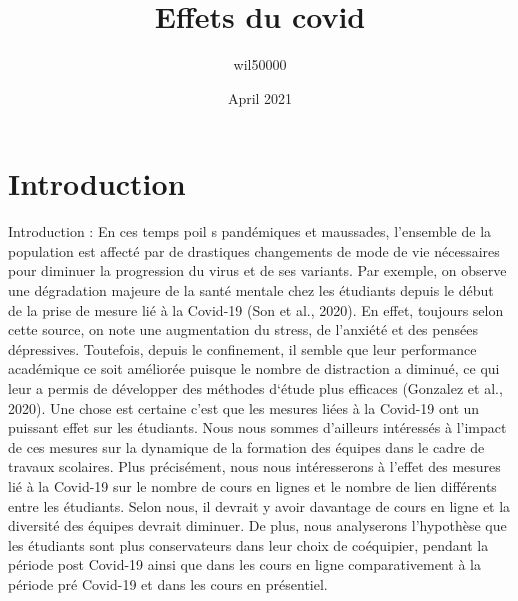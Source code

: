 \documentclass{article}
\title{Effets du covid}
\author{wil50000 }
\date{April 2021}
\begin{document}
\maketitle

\section{Introduction}
Introduction :  
En ces temps poil s pandémiques et maussades, l’ensemble de la population est affecté par de drastiques changements de mode de vie nécessaires pour diminuer la progression du virus et de ses variants. Par exemple, on observe une dégradation majeure de la santé mentale chez les étudiants depuis le début de la prise de mesure lié à la Covid-19 (Son et al., 2020). En effet, toujours selon cette source, on note une augmentation du stress, de l’anxiété et des pensées dépressives. Toutefois, depuis le confinement, il semble que leur performance académique ce soit améliorée puisque le nombre de distraction a diminué, ce qui leur a permis de développer des méthodes d‘étude plus efficaces (Gonzalez et al., 2020). Une chose est certaine c’est que les mesures liées à la Covid-19 ont un puissant effet sur les étudiants. Nous nous sommes d’ailleurs intéressés à l’impact de ces mesures sur la dynamique de la formation des équipes dans le cadre de travaux scolaires. Plus précisément, nous nous intéresserons à l’effet des mesures lié à la Covid-19 sur le nombre de cours en lignes et le nombre de lien différents entre les étudiants. Selon nous, il devrait y avoir davantage de cours en ligne et la diversité des équipes devrait diminuer. De plus, nous analyserons l’hypothèse que les étudiants sont plus conservateurs dans leur choix de coéquipier, pendant la période post Covid-19 ainsi que dans les cours en ligne comparativement à la période pré Covid-19 et dans les cours en présentiel. 
\end{document}
